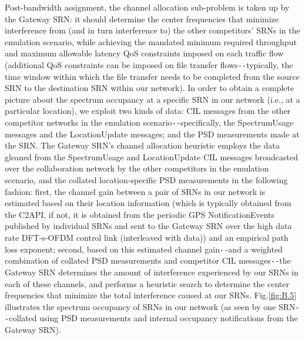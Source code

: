 Post-bandwidth assignment, the channel allocation sub-problem is taken up by the Gateway SRN: it should determine the center frequencies that minimize interference from (and in turn interference to) the other competitors' SRNs in the emulation scenario, while achieving the mandated minimum required throughput and maximum allowable latency QoS constraints imposed on each traffic flow (additional QoS constraints can be imposed on file transfer flows\texttt{-{}-}typically, the time window within which the file transfer needs to be completed from the source SRN to the destination SRN within our network). In order to obtain a complete picture about the spectrum occupancy at a specific SRN in our network (i.e., at a particular location), we exploit two kinds of data: CIL messages from the other competitor networks in the emulation scenario\texttt{-{}-}specifically, the SpectrumUsage messages and the LocationUpdate messages; and the PSD measurements made at the SRN. The Gateway SRN's channel allocation heuristic employs the data gleaned from the SpectrumUsage and LocationUpdate CIL messages broadcasted over the collaboration network by the other competitors in the emulation scenario, and the collated location-specific PSD measurements in the following fashion: first, the channel gain between a pair of SRNs in our network is estimated based on their location information (which is typically obtained from the C2API, if not, it is obtained from the periodic GPS NotificationEvents published by individual SRNs and sent to the Gateway SRN over the high data rate DFT-s-OFDM control link (interleaved with data)) and an empirical path loss exponent; second, based on this estimated channel gain\texttt{-{}-}and a weighted combination of collated PSD measurements and competitor CIL messages\texttt{-{}-}the Gateway SRN determines the amount of interference experienced by our SRNs in each of these channels, and performs a heuristic search to determine the center frequencies that minimize the total interference caused at our SRNs. Fig.\ref{fig:B.5} illustrates the spectrum occupancy of SRNs in our network (as seen by one SRN\texttt{-{}-}collated using PSD measurements and internal occupancy notifications from the Gateway SRN).
